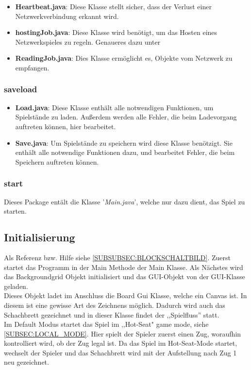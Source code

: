 \documentclass[12pt,a4paper]{article}
\newcommand{\cmnt}[1]{}			%
\begin{document}
{\begin{itemize}
	\item{\textbf{Heartbeat.java}: Diese Klasse stellt sicher, dass der Verlust einer Netzwerkverbindung erkannt wird.}
	\item{\textbf{hostingJob.java}: Diese Klasse wird benötigt, um das Hosten eines Netzwerkspieles zu regeln. Genaueres dazu unter} %
	\item{\textbf{ReadingJob.java}: Dies Klasse ermöglicht es, Objekte vom Netzwerk zu empfangen. }
\end{itemize}

\subsubsection{saveload}

\begin{itemize}

	\item{\textbf{Load.java}: Diese Klasse enthält alle notwendigen Funktionen, um Spielstände zu laden. Außerdem werden alle Fehler, die beim Ladevorgang auftreten können, hier bearbeitet.  }
	
	\item{\textbf{Save.java}: Um Spielstände zu speichern wird diese Klasse benötzigt. Sie enthält alle notwendige Funktionen dazu, und bearbeitet Fehler, die beim Speichern auftreten können. }


\end{itemize}

\subsubsection{start}

Dieses Package entält die Klasse '\textit{Main.java}', welche nur dazu dient, das Spiel zu starten.

\newpage
\subsection{Initialisierung}
\label{SUBSEC:INIT}

\cmnt{Hier soll erklärt werden wie JavaChess initialisiert wird.}

Als Referenz bzw. Hilfe siehe \ref{SUBSUBSEC:BLOCKSCHALTBILD}.
Zuerst startet das Programm in der Main Methode der Main Klasse. Als Nächstes wird das Backgroundgrid Objekt initialisiert und das GUI-Objekt von der GUI-Klasse geladen. \\
Dieses Objekt ladet im Anschluss die Board Gui Klasse, welche ein Canvas ist. In diesem ist eine gewisse Art des Zeichnens möglich. Dadurch wird auch das Schachbrett gezeichnet und in dieser Klasse findet der ,,Spielfluss'' statt. \\ 
Im Default Modus startet das Spiel im ,,Hot-Seat" game mode, siehe \ref{SUBSEC:LOCAL_MODE}. Hier spielt der Spieler zuerst einen Zug, woraufhin kontrolliert wird, ob der Zug legal ist. Da das Spiel im Hot-Seat-Mode startet, wechselt der Spieler und das Schachbrett wird mit der Aufstellung nach Zug 1 neu gezeichnet.

}
\end{document}
